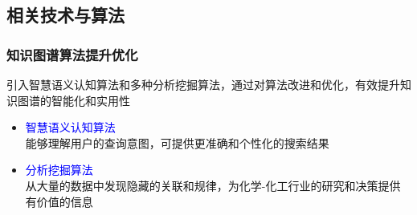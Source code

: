 \subsection{相关技术与算法}
\begin{frame}
	\frametitle{知识图谱算法提升优化}
	引入智慧语义认知算法和多种分析挖掘算法，通过对算法改进和优化，有效提升知识图谱的智能化和实用性
	\vskip 20pt
	\begin{itemize}
	 \setlength{\itemsep}{15pt}
		\item \textcolor{blue}{智慧语义认知算法}\\
能够理解用户的查询意图，可提供更准确和个性化的搜索结果
\item \textcolor{blue}{分析挖掘算法}\\
	从大量的数据中发现隐藏的关联和规律，为化学-化工行业的研究和决策提供有价值的信息
	\end{itemize}
\end{frame}

